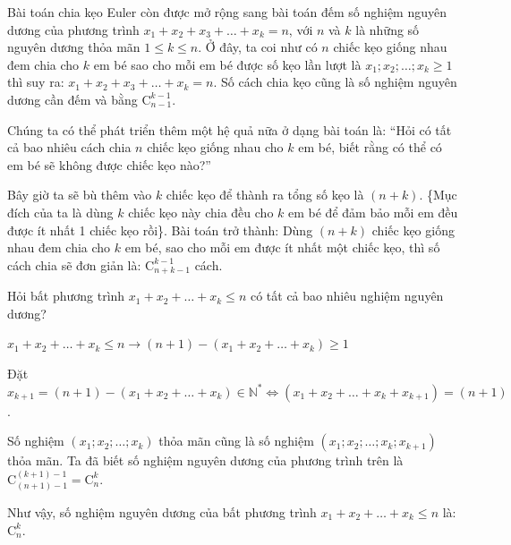 \documentclass[12pt, a4paper]{article}
\begin{document}
	
		 Bài toán chia kẹo Euler còn được mở rộng sang bài toán đếm số nghiệm nguyên dương của phương trình \(x_1 + x_2 + x_3 + \dots + x_k = n\), với \(n\) và \(k\) là những số nguyên dương thỏa mãn \(1 \le k \le n\). Ở đây, ta coi như có \(n\) chiếc kẹo giống nhau đem chia cho \(k\) em bé sao cho mỗi em bé được số kẹo lần lượt là \(x_1; x_2; \dots; x_k \ge 1\) thì suy ra: \(x_1 + x_2 + x_3 + \dots + x_k = n\).
		Số cách chia kẹo cũng là số nghiệm nguyên dương cần đếm và bằng \(\mathrm{C}_{n-1}^{k-1}\).
		
		\vspace{0.3cm}
		
	 Chúng ta có thể phát triển thêm một hệ quả nữa ở dạng bài toán là: ``Hỏi có tất cả bao nhiêu cách chia \(n\) chiếc kẹo giống nhau cho \(k\) em bé, biết rằng có thể có em bé sẽ không được chiếc kẹo nào?''
		
		
		\noindent Bây giờ ta sẽ bù thêm vào \(k\) chiếc kẹo để thành ra tổng số kẹo là \((n+k)\). \{Mục đích của ta là dùng \(k\) chiếc kẹo này chia đều cho \(k\) em bé để đảm bảo mỗi em đều được ít nhất 1 chiếc kẹo rồi\}. Bài toán trở thành: Dùng \((n+k)\) chiếc kẹo giống nhau đem chia cho \(k\) em bé, sao cho mỗi em được ít nhất một chiếc kẹo, thì số cách chia sẽ đơn giản là: \(\mathrm{C}_{n+k-1}^{k-1}\) cách.
		
		\vspace{0.3cm}
		
		 Hỏi bất phương trình \(x_1 + x_2 + \dots + x_k \le n\) có tất cả bao nhiêu nghiệm nguyên dương?
		
		
		\noindent \(x_1 + x_2 + \dots + x_k \le n \longrightarrow (n+1) - (x_1 + x_2 + \dots + x_k) \ge 1\)
		
		\noindent Đặt \(x_{k+1} = (n+1) - (x_1 + x_2 + \dots + x_k) \in \mathbb{N}^* \Leftrightarrow (x_1 + x_2 + \dots + x_k + x_{k+1}) = (n+1)\).
		
		\noindent Số nghiệm \((x_1; x_2; \dots; x_k)\) thỏa mãn cũng là số nghiệm \((x_1; x_2; \dots; x_k; x_{k+1})\) thỏa mãn. Ta đã biết số nghiệm nguyên dương của phương trình trên là \(\mathrm{C}_{(n+1)-1}^{(k+1)-1} = \mathrm{C}_n^k\).
		
		\noindent Như vậy, số nghiệm nguyên dương của bất phương trình \(x_1 + x_2 + \dots + x_k \le n\) là: \(\mathrm{C}_n^k\).
		
\end{document}
